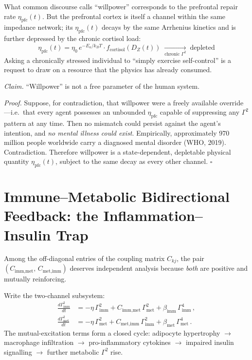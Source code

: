 \documentclass[aps,pre,twocolumn,superscriptaddress,floatfix]{revtex4-2}
\begin{document}
\begin{remark}
\label{rem:willpower}
What common discourse calls ``willpower''
corresponds to the prefrontal repair rate
$\eta_{\text{pfc}}(t)$.
But the prefrontal cortex is itself a channel
within the same impedance network;
its $\eta_{\text{pfc}}(t)$ decays by the same
Arrhenius kinetics and is further depressed by
the chronic cortisol load:
\[
  \eta_{\text{pfc}}(t)
  = \eta_0 \, e^{-E_a/k_B T}
    \cdot f_{\text{cortisol}}(D_Z(t))
  \;\xrightarrow[\text{chronic }\Gamma^2]{}\;
  \text{depleted}
\]
Asking a chronically stressed individual
to ``simply exercise self-control'' is a request
to draw on a resource that the physics has already
consumed.
\end{remark}

\begin{proposition}
\label{prop:no-free-will}
\emph{Claim.}\;
``Willpower'' is not a free parameter of the
human system.

\emph{Proof.}\;
Suppose, for contradiction, that willpower
were a freely available override---i.e.\ that
every agent possesses an unbounded
$\eta_{\text{pfc}}$ capable of suppressing
any $\Gamma^2$ pattern at any time.
Then no mismatch could persist against the agent's
intention, and \emph{no mental illness could exist}.
Empirically, approximately 970 million
people worldwide carry a diagnosed mental
disorder (WHO, 2019).
Contradiction.
Therefore willpower is a
state-dependent, depletable physical quantity
$\eta_{\text{pfc}}(t)$, subject to the same
decay as every other channel.
$\square$
\end{proposition}


\section{Immune--Metabolic Bidirectional Feedback:
  the Inflammation--Insulin Trap}
\label{sec:imm-met-loop}

Among the off-diagonal entries of the coupling
matrix $C_{kj}$, the pair
$(C_{\text{imm,met}},\,C_{\text{met,imm}})$
deserves independent analysis because \emph{both}
are positive and mutually reinforcing.

Write the two-channel subsystem:
\begin{align}
  \frac{d\Gamma_{\text{imm}}^2}{dt}
  &= -\eta\,\Gamma_{\text{imm}}^2
     + C_{\text{imm,met}}\,\Gamma_{\text{met}}^2
     + \beta_{\text{imm}}\,\Gamma_{\text{imm}}^4\,,
  \label{eq:imm-loop} \\
  \frac{d\Gamma_{\text{met}}^2}{dt}
  &= -\eta\,\Gamma_{\text{met}}^2
     + C_{\text{met,imm}}\,\Gamma_{\text{imm}}^2
     + \beta_{\text{met}}\,\Gamma_{\text{met}}^4\,.
  \label{eq:met-loop}
\end{align}
The mutual-excitation terms form a closed cycle:
adipocyte hypertrophy $\to$ macrophage infiltration
$\to$ pro-inflammatory cytokines $\to$ impaired
insulin signalling $\to$ further metabolic
$\Gamma^2$ rise.
\end{document}
